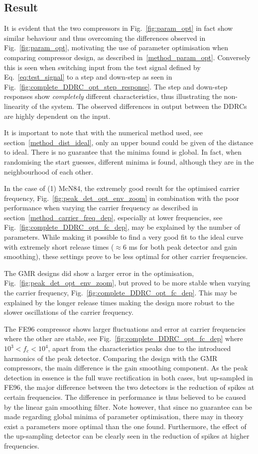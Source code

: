 \documentclass[../main2.tex]{subfiles}
\begin{document}
\subsection{Result}\label{discussion_results}
It is evident that the two compressors in Fig.~\ref{fig:param_opt} in fact show similar behaviour and thus overcoming the differences observed in Fig.~\ref{fig:param_opt}, motivating the use of parameter optimisation when comparing compressor design, as described in~\ref{method_param_opt}. Conversely this is seen when switching input from the test signal defined by Eq.~\ref{eq:test_signal} to a step and down-step as seen in Fig.~\ref{fig:complete_DDRC_opt_step_response}. The step and down-step responses show \emph{completely} different characteristics, thus illustrating the non-linearity of the system. The observed differences in output between the DDRCs are highly dependent on the input.

It is important to note that with the numerical method used, see section~\ref{method_dist_ideal}, only an upper bound could be given of the distance to ideal. There is no guarantee that the minima found is global. In fact, when randomising the start guesses, different minima is found, although they are in the neighbourhood of each other.

In the case of (1) McN84, the extremely good result for the optimised carrier frequency, Fig.~\ref{fig:peak_det_opt_env_zoom} in combination with the poor performance when varying the carrier frequency as described in section~\ref{method_carrier_freq_dep}, especially at lower frequencies, see Fig.~\ref{fig:complete_DDRC_opt_fc_dep}, may be explained by the number of parameters. While making it possible to find a very good fit to the ideal curve with extremely short release times ($\approx 6$ ms for both peak detector and gain smoothing), these settings prove to be less optimal for other carrier frequencies.

The GMR designs did show a larger error in the optimisation, Fig.~\ref{fig:peak_det_opt_env_zoom}, but proved to be more stable when varying the carrier frequency, Fig.~\ref{fig:complete_DDRC_opt_fc_dep}. This may be explained by the longer release times making the design more robust to the slower oscillations of the carrier frequency. 

The FE96 compressor shows larger fluctuations and error at carrier frequencies where the other are stable, see Fig.~\ref{fig:complete_DDRC_opt_fc_dep} where $10^3<f_c<10^4$, apart from the characteristics peaks due to the introduced harmonics of the peak detector. Comparing the design with the GMR compressors, the main difference is the gain smoothing component. As the peak detection in essence is the full wave rectification in both cases, but up-sampled in FE96, the major difference between the two detectors is the reduction of spikes at certain frequencies. The difference in performance is thus believed to be caused by the linear gain smoothing filter. Note however, that since no guarantee can be made regarding global minima of parameter optimisation, there may in theory exist a parameters more optimal than the one found. Furthermore, the effect of the up-sampling detector can be clearly seen in the reduction of spikes at higher frequencies.
\end{document}
